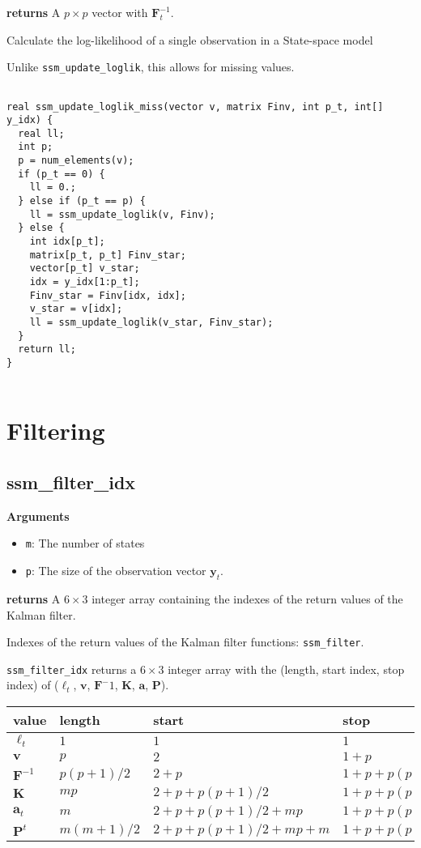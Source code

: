 \documentclass[]{book}
\providecommand{\tightlist}{%
  \setlength{\itemsep}{0pt}\setlength{\parskip}{0pt}}
\newcommand{\mat}[1]{\boldsymbol{#1}}
\renewcommand{\vec}[1]{\boldsymbol{#1}}
\begin{document}
\textbf{returns} A \(p \times p\) vector with \(\mat{F}^{-1}_t\).

Calculate the log-likelihood of a single observation in a State-space
model

Unlike \texttt{ssm\_update\_loglik}, this allows for missing values.

\begin{verbatim}

real ssm_update_loglik_miss(vector v, matrix Finv, int p_t, int[] y_idx) {
  real ll;
  int p;
  p = num_elements(v);
  if (p_t == 0) {
    ll = 0.;
  } else if (p_t == p) {
    ll = ssm_update_loglik(v, Finv);
  } else {
    int idx[p_t];
    matrix[p_t, p_t] Finv_star;
    vector[p_t] v_star;
    idx = y_idx[1:p_t];
    Finv_star = Finv[idx, idx];
    v_star = v[idx];
    ll = ssm_update_loglik(v_star, Finv_star);
  }
  return ll;
}


\end{verbatim}

\section{Filtering}\label{filtering-3}

\subsection{ssm\_filter\_idx}\label{ssm_filter_idx}

\textbf{Arguments}

\begin{itemize}
\tightlist
\item
  \texttt{m}: The number of states
\item
  \texttt{p}: The size of the observation vector \(\vec{y}_t\).
\end{itemize}

\textbf{returns} A \(6 \times 3\) integer array containing the indexes
of the return values of the Kalman filter.

Indexes of the return values of the Kalman filter functions:
\texttt{ssm\_filter}.

\texttt{ssm\_filter\_idx} returns a \(6 \times 3\) integer array with
the (length, start index, stop index) of (\(\ell_t\), \(\vec{v}\),
\(\vec{F}^-1\), \(\mat{K}\), \(\vec{a}\), \(\mat{P}\)).

\begin{longtable}[]{@{}llll@{}}
\toprule
value & length & start & stop\tabularnewline
\midrule
\endhead
\(\ell_t\) & \(1\) & \(1\) & \(1\)\tabularnewline
\(\vec{v}\) & \(p\) & \(2\) & \(1 + p\)\tabularnewline
\(\mat{F}^{-1}\) & \(p (p + 1) / 2\) & \(2 + p\) &
\(1 + p + p (p + 1) / 2\)\tabularnewline
\(\mat{K}\) & \(mp\) & \(2 + p + p (p + 1) / 2\) &
\(1 + p + p (p + 1) / 2 + mp\)\tabularnewline
\(\vec{a}_t\) & \(m\) & \(2 + p + p (p + 1) / 2 + mp\) &
\(1 + p + p (p + 1) / 2 + mp + m\)\tabularnewline
\(\mat{P}^t\) & \(m (m + 1) / 2\) & \(2 + p + p (p + 1) / 2 + mp + m\) &
\(1 + p + p (p + 1) / 2 + mp + m (m + 1) / 2\)\tabularnewline
\bottomrule
\end{longtable}
\end{document}
